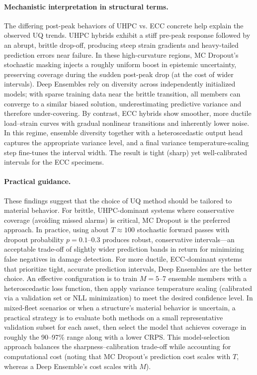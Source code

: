 \documentclass{article}
\begin{document}
\paragraph{Mechanistic interpretation in structural terms.} The differing post-peak behaviors of UHPC vs. ECC concrete help explain the observed UQ trends. UHPC hybrids exhibit a stiff pre-peak response followed by an abrupt, brittle drop-off, producing steep strain gradients and heavy-tailed prediction errors near failure. In these high-curvature regions, MC Dropout’s stochastic masking injects a roughly uniform boost in epistemic uncertainty, preserving coverage during the sudden post-peak drop (at the cost of wider intervals). Deep Ensembles rely on diversity across independently initialized models; with sparse training data near the brittle transition, all members can converge to a similar biased solution, underestimating predictive variance and therefore under-covering. By contrast, ECC hybrids show smoother, more ductile load–strain curves with gradual nonlinear transitions and inherently lower noise. In this regime, ensemble diversity together with a heteroscedastic output head captures the appropriate variance level, and a final variance temperature-scaling step fine-tunes the interval width. The result is tight (sharp) yet well-calibrated intervals for the ECC specimens.

\paragraph{Practical guidance.} These findings suggest that the choice of UQ method should be tailored to material behavior. For brittle, UHPC-dominant systems where conservative coverage (avoiding missed alarms) is critical, MC Dropout is the preferred approach. In practice, using about $T\approx100$ stochastic forward passes with dropout probability $p=0.1$–0.3 produces robust, conservative intervals—an acceptable trade-off of slightly wider prediction bands in return for minimizing false negatives in damage detection. For more ductile, ECC-dominant systems that prioritize tight, accurate prediction intervals, Deep Ensembles are the better choice. An effective configuration is to train $M=5$–7 ensemble members with a heteroscedastic loss function, then apply variance temperature scaling (calibrated via a validation set or NLL minimization) to meet the desired confidence level. In mixed-fleet scenarios or when a structure’s material behavior is uncertain, a practical strategy is to evaluate both methods on a small representative validation subset for each asset, then select the model that achieves coverage in roughly the 90–97\% range along with a lower CRPS. This model-selection approach balances the sharpness–calibration trade-off while accounting for computational cost (noting that MC Dropout’s prediction cost scales with $T$, whereas a Deep Ensemble’s cost scales with $M$).
\end{document}
